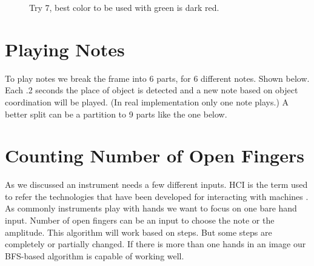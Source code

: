 \begin{figure}
\caption{Try 7, best color to be used with green is dark red.}
\end{figure}
	

\section{Playing Notes}
To play notes we break the frame into 6 parts, for 6 different notes. Shown below. Each .2 seconds the place of object is detected and a new note based on object coordination will be played. (In real implementation only one note plays.) A better split can be a partition to 9 parts like the one below.

\section{Counting Number of Open Fingers}
As we discussed an instrument needs a few different inputs. HCI
is the term used to refer the technologies that have been developed for interacting with machines \cite{dey2014algorithm}. As commonly instruments play with hands we want to focus on one bare hand input. Number of open fingers can be an input to choose the note or the amplitude. This algorithm will work based on \cite{dey2014algorithm} steps. But some steps are completely or partially changed. If there is more than one hands in an image our BFS-based algorithm is capable of working well.
